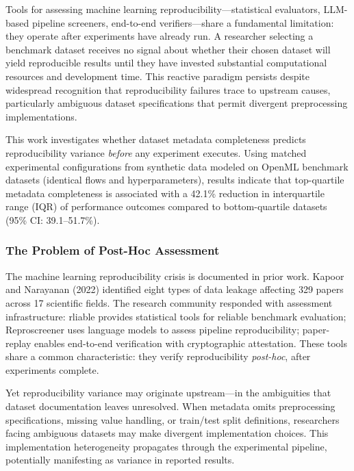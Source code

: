 
Tools for assessing machine learning reproducibility---statistical evaluators, LLM-based pipeline screeners, end-to-end verifiers---share a fundamental limitation: they operate after experiments have already run. A researcher selecting a benchmark dataset receives no signal about whether their chosen dataset will yield reproducible results until they have invested substantial computational resources and development time. This reactive paradigm persists despite widespread recognition that reproducibility failures trace to upstream causes, particularly ambiguous dataset specifications that permit divergent preprocessing implementations.

This work investigates whether dataset metadata completeness predicts reproducibility variance \textit{before} any experiment executes. Using matched experimental configurations from synthetic data modeled on OpenML benchmark datasets (identical flows and hyperparameters), results indicate that top-quartile metadata completeness is associated with a 42.1\% reduction in interquartile range (IQR) of performance outcomes compared to bottom-quartile datasets (95\% CI: 39.1--51.7\%).

\subsubsection{The Problem of Post-Hoc Assessment}

The machine learning reproducibility crisis is documented in prior work. Kapoor and Narayanan (2022) identified eight types of data leakage affecting 329 papers across 17 scientific fields. The research community responded with assessment infrastructure: rliable \citep{agarwal2021deep} provides statistical tools for reliable benchmark evaluation; Reproscreener \citep{bhaskar2024reproscreener} uses language models to assess pipeline reproducibility; paper-replay enables end-to-end verification with cryptographic attestation. These tools share a common characteristic: they verify reproducibility \textit{post-hoc}, after experiments complete.

Yet reproducibility variance may originate upstream---in the ambiguities that dataset documentation leaves unresolved. When metadata omits preprocessing specifications, missing value handling, or train/test split definitions, researchers facing ambiguous datasets may make divergent implementation choices. This implementation heterogeneity propagates through the experimental pipeline, potentially manifesting as variance in reported results.


